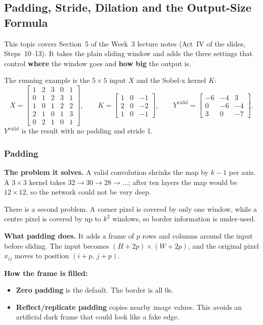 \subsection*{Padding, Stride, Dilation and the Output-Size Formula}

This topic covers Section~5 of the Week~3 lecture notes (Act~IV of the slides, Steps~10--13). It takes the plain sliding window and adds the three settings that control \textbf{where} the window goes and \textbf{how big} the output is.

The running example is the $5\times5$ input $X$ and the Sobel-x kernel $K$:
\[
X=\begin{bmatrix}1&2&3&0&1\\0&1&2&3&1\\1&0&1&2&2\\2&1&0&1&3\\0&2&1&0&1\end{bmatrix},\qquad
K=\begin{bmatrix}1&0&-1\\2&0&-2\\1&0&-1\end{bmatrix},\qquad
Y^{\text{valid}}=\begin{bmatrix}-6&-4&3\\0&-6&-4\\3&0&-7\end{bmatrix}.
\]
$Y^{\text{valid}}$ is the result with no padding and stride 1.

\subsubsection*{Padding}

\textbf{The problem it solves.} A valid convolution shrinks the map by $k-1$ per axis. A $3\times3$ kernel takes $32\to30\to28\to\dots$; after ten layers the map would be $12\times12$, so the network could not be very deep.

There is a second problem. A corner pixel is covered by only one window, while a centre pixel is covered by up to $k^2$ windows, so border information is under-used.

\textbf{What padding does.} It adds a frame of $p$ rows and columns around the input before sliding. The input becomes $(H+2p)\times(W+2p)$, and the original pixel $x_{ij}$ moves to position $(i+p,\,j+p)$.

\textbf{How the frame is filled:}
\begin{itemize}
  \item \textbf{Zero padding} is the default. The border is all 0s.
  \item \textbf{Reflect/replicate padding} copies nearby image values. This avoids an artificial dark frame that could look like a fake edge.
\end{itemize}

